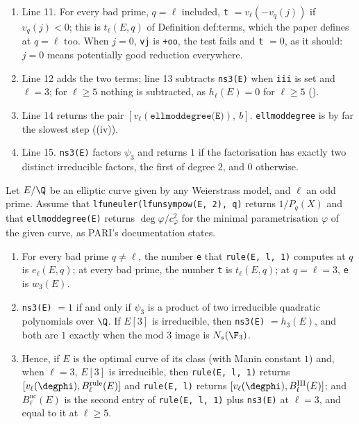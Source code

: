 \begin{sloppypar}
\begin{remark}
\begin{enumerate}[label=(\alph*)]
\item Line 11. For every bad prime, $q=\ell$ included, \texttt{t} $=v_\ell(-v_q(j))$ if $v_q(j)<0$; this is $t_\ell(E,q)$ of Definition def:terms, which
the paper defines at $q=\ell$ too. When $j=0$, \texttt{vj} is \texttt{+oo}, the test fails and \texttt{t} $=0$, as it should: $j=0$ means potentially good
reduction everywhere.
\item Line 12 adds the two terms; line 13 subtracts \texttt{ns3(E)} when \texttt{iii} is set and $\ell=3$; for $\ell\ge5$ nothing is subtracted, as
$h_\ell(E)=0$ for $\ell\ge5$ ().
\item Line 14 returns the pair $[v_\ell(\texttt{ellmoddegree(E)}),\ b]$. \texttt{ellmoddegree} is by far the slowest step
((iv)).
\item Line 15. \texttt{ns3(E)} factors $\psi_3$ and returns $1$ if the factorisation has exactly two distinct irreducible factors, the first of
degree $2$, and $0$ otherwise.
\end{enumerate}
\end{remark}

\begin{proposition}\label{prop:computation:rule-correct}
Let $E/\Q$ be an elliptic curve given by any Weierstrass model, and $\ell$ an odd prime. Assume that \texttt{lfuneuler(lfunsympow(E, 2), q)}
returns $1/P_q(X)$ and that \texttt{ellmoddegree(E)} returns $\deg\varphi/c_\varphi^2$ for the minimal parametrisation $\varphi$ of the given curve, as
PARI's documentation states.
\begin{enumerate}[label=(\roman*)]
\item For every bad prime $q\ne\ell$, the number \texttt{e} that \texttt{rule(E, l, 1)} computes at $q$ is $e_\ell(E,q)$; at every bad prime, the
number \texttt{t} is $t_\ell(E,q)$; at $q=\ell=3$, \texttt{e} is $w_3(E)$.
\item \texttt{ns3(E)} $=1$ if and only if $\psi_3$ is a product of two irreducible quadratic polynomials over $\Q$. If $E[3]$ is irreducible, then
\texttt{ns3(E)} $=h_3(E)$, and both are $1$ exactly when the mod $3$ image is $N_s(\F_3)$.
\item Hence, if $E$ is the optimal curve of its class (with Manin constant $1$) and, when $\ell=3$, $E[3]$ is irreducible, then
\texttt{rule(E, l, 1)} returns $[v_\ell(\degphi),B^{\mathrm{rule}}_\ell(E)]$ and \texttt{rule(E, l)} returns $[v_\ell(\degphi),B^{\mathrm{III}}_\ell(E)]$; and
$B^{\mathrm{nc}}_\ell(E)$ is the second entry of \texttt{rule(E, l, 1)} plus \texttt{ns3(E)} at $\ell=3$, and equal to it at $\ell\ge5$.
\end{enumerate}
\end{proposition}


\end{sloppypar}
